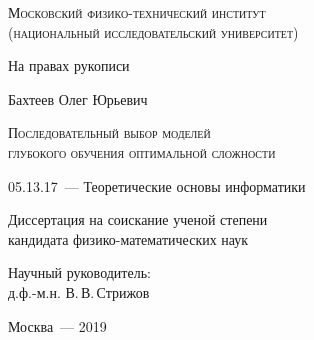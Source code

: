 \thispagestyle{empty}


\begin{titlepage}
\begin{center}
\textsc{Московский физико-технический институт \\ (национальный исследовательский университет)}\\
\end{center}
\vspace{1.5cm}
\begin{flushright}
{На правах рукописи}
\end{flushright}
\vspace{1.5cm}
\begin{center}
{Бахтеев Олег Юрьевич}
\par
\vspace{2cm}
\textsc{Последовательный выбор моделей \\глубокого обучения оптимальной сложности}
\par
\vspace{2cm}
{05.13.17~--- Теоретические основы информатики}
\par
\vspace{2cm}
{Диссертация на соискание ученой степени\\
кандидата физико-математических наук}
\end{center}
\vspace{2cm}
\hfill\parbox{8,4cm}{Научный руководитель:
\\д.ф.-м.н. В.\,В.\,Стрижов}
\par
\vspace{3.5cm}
\begin{center}
{Москва~--- 2019}
\end{center}
\end{titlepage}



\newpage{}
